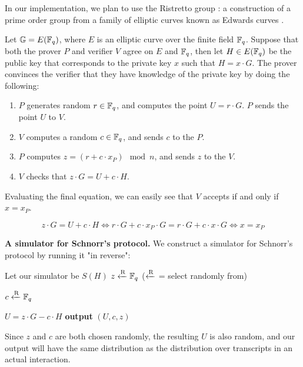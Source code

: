 In our implementation, we plan to use the Ristretto group \cite{ristretto_web}: a construction of a prime order group from a family of elliptic curves known as Edwards curves \cite{Edwards2007}. 

\begin{definition}
Let $\mathbb{G} = E(\mathbb{F}_q)$, where $E$ is an elliptic curve over the finite field $\mathbb{F}_q$. Suppose that both the prover $P$ and verifier $V$ agree on $E$ and $\mathbb{F}_q$, then let $H \in E(\mathbb{F}_q)$ be the public key that corresponds to the private key $x$ such that $H = x \cdot G$. The prover convinces the verifier that they have knowledge of the private key by doing the following:

\begin{enumerate}
    \item $P$ generates random $r \in \mathbb{F}_q$, and computes the point $U = r \cdot G$. $P$ sends the point $U$ to $V$.
    \item $V$ computes a random $c \in \mathbb{F}_q$, and sends $c$ to the $P$.
    \item $P$ computes $z = (r + c \cdot x_P) \mod n$, and sends $z$ to the $V$.
    \item $V$ checks that $z \cdot G = U + c \cdot H$.
\end{enumerate} 

Evaluating the final equation, we can easily see that $V$ accepts if and only if $x = x_P$. 

\begin{equation*}
    z \cdot G = U + c \cdot H \iff
    r \cdot G + c \cdot x_P \cdot G  = r \cdot G + c \cdot x \cdot G \iff
    x  =  x_P
\end{equation*}
\end{definition}


\textbf{A simulator for Schnorr's protocol.} We construct a simulator for Schnorr's protocol by running it "in reverse":

\begin{center}
    \begin{problem}[]{Let our simulator be $S(H)$}
    $z \xleftarrow{\text{\scriptsize R}} \mathbb{F}_q$ ($\xleftarrow{\text{\scriptsize R}}$ = select randomly from)
    
    $c \xleftarrow{\text{\scriptsize R}} \mathbb{F}_q$
    
    $U = z \cdot G - c \cdot H$
    \tcblower
    \textbf{output} $(U,c,z)$
    \end{problem}
\end{center}

Since $z$ and $c$ are both chosen randomly, the resulting $U$ is also random, and our output will have the same distribution as the distribution over transcripts in an actual interaction.

